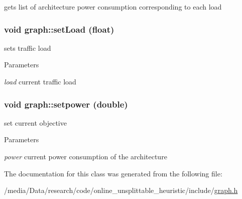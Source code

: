 gets list of architecture power consumption corresponding to each load 

\hypertarget{classgraph_af551af99376a1d3fa4e0181a682aa224}{
\subsubsection[{setLoad}]{\setlength{\rightskip}{0pt plus 5cm}void graph::setLoad (float)}}
\label{classgraph_af551af99376a1d3fa4e0181a682aa224}


sets traffic load 


\begin{DoxyParams}{Parameters}
\item[{\em load}]current traffic load \end{DoxyParams}
\hypertarget{classgraph_ac78fb63912db679ad11b55dd25021145}{
\subsubsection[{setpower}]{\setlength{\rightskip}{0pt plus 5cm}void graph::setpower (double)}}
\label{classgraph_ac78fb63912db679ad11b55dd25021145}


set current objective 


\begin{DoxyParams}{Parameters}
\item[{\em power}]current power consumption of the architecture \end{DoxyParams}


The documentation for this class was generated from the following file:\begin{DoxyCompactItemize}
\item 
/media/Data/research/code/online\_\-unsplittable\_\-heuristic/include/\hyperlink{graph_8h}{graph.h}\end{DoxyCompactItemize}
